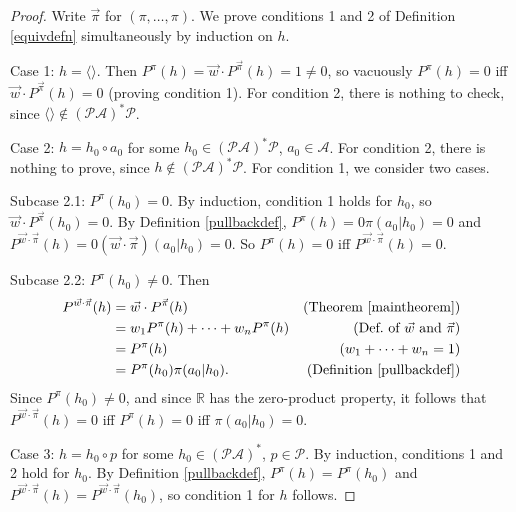 \documentclass[twoside]{article}
\begin{document}
\begin{proof}
    Write $\vec\pi$ for $(\pi,\ldots,\pi)$.
    We prove conditions 1 and 2 of Definition \ref{equivdefn}
    simultaneously by induction on $h$.
 
    Case 1: $h=\langle\rangle$. Then
    $P^\pi(h)=\vec w\cdot{P^{\vec\pi}}(h)=1\not=0$, so
    vacuously $P^\pi(h)=0$ iff $\vec w\cdot{P^{\vec\pi}}(h)=0$
    (proving condition 1).
    For condition 2, there is nothing to check, since
    $\langle\rangle\not\in(\mathcal P\mathcal A)^*\mathcal P$.

    Case 2: $h=h_0\circ a_0$ for some
        $h_0\in(\mathcal P\mathcal A)^*\mathcal P$, $a_0\in\mathcal A$.
        For condition 2, there is nothing to prove, since
        $h\not\in(\mathcal P\mathcal A)^*\mathcal P$.
        For condition 1, we consider two cases.

        Subcase 2.1: $P^\pi(h_0)=0$.
        By induction, condition 1 holds for $h_0$, so
        $\vec w\cdot{P^{\vec\pi}}(h_0)=0$.
        By Definition \ref{pullbackdef},
        $P^\pi(h)=0\pi(a_0|h_0)=0$
        and $P^{\vec w\cdot\vec\pi}(h)=0(\vec w\cdot\vec\pi)(a_0|h_0)=0$.
        So $P^\pi(h)=0$ iff $P^{\vec w\cdot\vec\pi}(h)=0$.

        Subcase 2.2: $P^\pi(h_0)\not=0$.
        Then
        \begin{align*}
            P^{\vec w\cdot \vec\pi}(h)
                &= \vec w\cdot{P^{\vec\pi}}(h)
                    &\mbox{(Theorem \ref{maintheorem})}\\
                &= w_1 P^\pi(h)+\cdots+w_n P^\pi(h)
                    &\mbox{(Def.\ of $\vec w$ and $\vec\pi$)}\\
                &= P^\pi(h)
                    &\mbox{($w_1+\cdots+w_n=1$)}\\
                &= P^\pi(h_0)\pi(a_0|h_0).
                    &\mbox{(Definition \ref{pullbackdef})}
        \end{align*}
        Since $P^\pi(h_0)\not=0$, and since $\mathbb R$ has the zero-product property,
        it follows that
        $P^{\vec w\cdot\vec\pi}(h)=0$ iff $P^\pi(h)=0$ iff $\pi(a_0|h_0)=0$.

    Case 3: $h=h_0\circ p$ for some $h_0\in (\mathcal P\mathcal A)^*$,
        $p\in\mathcal P$.
        By induction, conditions 1 and 2 hold for $h_0$.
        By Definition \ref{pullbackdef},
        $P^\pi(h)=P^\pi(h_0)$ and
        $P^{\vec w\cdot\vec\pi}(h)=P^{\vec w\cdot\vec\pi}(h_0)$,
        so condition 1 for $h$ follows.


\end{proof}
\end{document}
